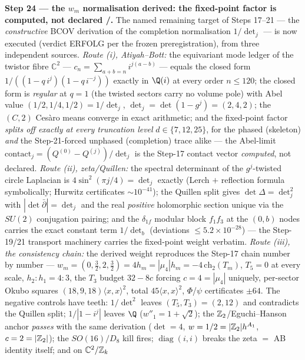 \par\smallskip\noindent\textbf{Step 24 --- the $w_m$ normalisation derived: the fixed-point
factor is computed, not declared \mE/\mC.} The named remaining target of Steps 17--21 --- the
\emph{constructive} BCOV derivation of the completion normalisation $1/\det_j$ --- is now
executed (verdict ERFOLG per the frozen preregistration), from three independent sources.
\emph{Route (i), Atiyah--Bott:} the equivariant mode ledger of the twistor fibre $\mathbb C^2$
--- $c_n = \sum_{a+b=n} i^{j(a-b)}$ --- equals the closed form $1/((1-q\,i^j)(1-q\,i^{-j}))$
exactly in $\Q(i)$ at every order $n \le 120$; the closed form is \emph{regular} at $q = 1$
(the twisted sectors carry no volume pole) with Abel value $(1/2, 1/4, 1/2) = 1/\det_j$,
$\det_j = \det(1-g^j) = (2, 4, 2)$; the $(C,2)$ Ces\`aro means converge in exact arithmetic;
and the fixed-point factor \emph{splits off exactly at every truncation level} $d \in
\{7, 12, 25\}$, for the phased (skeleton) \emph{and} the Step-21-forced unphased (completion)
trace alike --- the Abel-limit $\mathrm{contact}_j = (Q^{(0)} - Q^{(j)})/\det_j$ is the Step-17
contact vector \emph{computed}, not declared. \emph{Route (ii), zeta/Quillen:} the spectral
determinant of the $g^j$-twisted circle Laplacian is $4\sin^2(\pi j/4) = \det_j$ exactly
(Lerch $+$ reflection formula symbolically; Hurwitz certificates $\sim 10^{-41}$); the Quillen
split gives $\det\Delta = \det_j^2$ with $|\det\bar\partial| = \det_j$ and the real
\emph{positive} holomorphic section unique via the $SU(2)$ conjugation pairing; and the
$\delta_{1f}$ modular block $f_1f_3$ at the $(0,b)$ nodes carries the exact constant term
$1/\det_b$ (deviations $\le 5.2\times10^{-28}$) --- the Step-19/21 transport machinery carries
the fixed-point weight verbatim. \emph{Route (iii), the consistency chain:} the derived weight
reproduces the Step-17 chain number by number --- $w_m = (0, \tfrac32, 2, \tfrac32) = 4h_m =
|\mu_4|h_m = -4\,\mathrm{ch}_2(T_m)$, $T_5 = 0$ at every scale, $h_2 : h_1 = 4 : 3$, the $T_3$
budget $32 - 8c$ forcing $c = 4 = |\mu_4|$ uniquely, per-sector Okubo squares
$(18, 9, 18)\langle x,x\rangle^2$, total $45\langle x,x\rangle^2$, $\Phi$/$\psi$ certificates
$\pm64$. The negative controls have teeth: $1/\det^2$ leaves $(T_5, T_3) = (2, 12)$ and
contradicts the Quillen split; $1/|1-i^j|$ leaves $\Q$ ($w''_1 = 1+\sqrt2$); the
$\mathbb{Z}_2$/Eguchi--Hanson anchor \emph{passes} with the same derivation ($\det = 4$,
$w = 1/2 = |\mathbb{Z}_2|h^{A_1}$, $c = 2 = |\mathbb{Z}_2|$); the $SO(16)/D_8$ kill fires;
$\operatorname{diag}(i,i)$ breaks the zeta $=$ AB identity itself; and on $\mathbb C^2/\mathbb{Z}_k$
